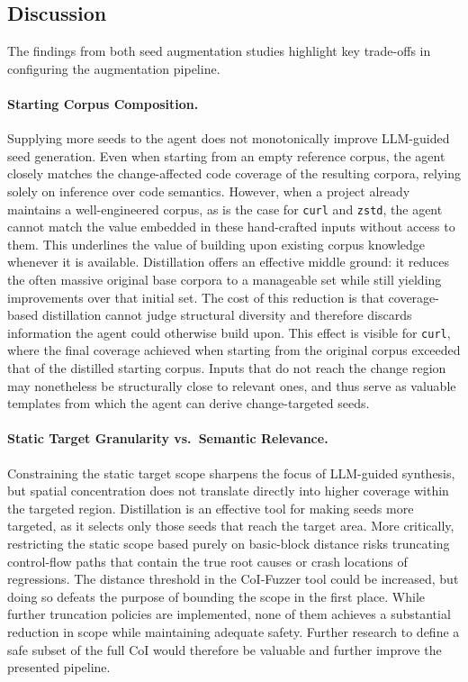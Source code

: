 \subsection{Discussion}
The findings from both seed augmentation studies highlight key trade-offs in configuring the augmentation pipeline.

\paragraph{Starting Corpus Composition.}
Supplying more seeds to the agent does not monotonically improve LLM-guided seed generation.
Even when starting from an empty reference corpus, the agent closely matches the change-affected code coverage of the resulting corpora, relying solely on inference over code semantics.
However, when a project already maintains a well-engineered corpus, as is the case for \texttt{curl} and \texttt{zstd}, the agent cannot match the value embedded in these hand-crafted inputs without access to them.
This underlines the value of building upon existing corpus knowledge whenever it is available.
Distillation offers an effective middle ground: it reduces the often massive original base corpora to a manageable set while still yielding improvements over that initial set.
The cost of this reduction is that coverage-based distillation cannot judge structural diversity and therefore discards information the agent could otherwise build upon.
This effect is visible for \texttt{curl}, where the final coverage achieved when starting from the original corpus exceeded that of the distilled starting corpus.
Inputs that do not reach the change region may nonetheless be structurally close to relevant ones, and thus serve as valuable templates from which the agent can derive change-targeted seeds.

\paragraph{Static Target Granularity vs.\ Semantic Relevance.}
Constraining the static target scope sharpens the focus of LLM-guided synthesis, but spatial concentration does not translate directly into higher coverage within the targeted region.
Distillation is an effective tool for making seeds more targeted, as it selects only those seeds that reach the target area.
More critically, restricting the static scope based purely on basic-block distance risks truncating control-flow paths that contain the true root causes or crash locations of regressions.
The distance threshold in the CoI-Fuzzer tool could be increased, but doing so defeats the purpose of bounding the scope in the first place.
While further truncation policies are implemented, none of them achieves a substantial reduction in scope while maintaining adequate safety.
Further research to define a safe subset of the full \ac{CoI} would therefore be valuable and further improve the presented pipeline.

